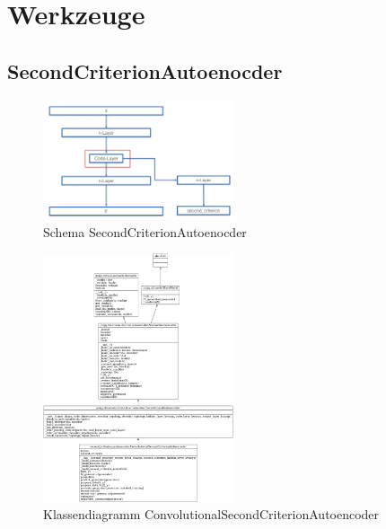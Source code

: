 \listoftodos


\chapter{Werkzeuge}
\label{chap:Werkzeuge}

	\section{SecondCriterionAutoenocder}
	\label{sec:SecondCriterionAutoenocder}
		
		
		
		\begin{figure}[h]
			\centering
			\includegraphics[width=0.5\textwidth, center]{bilder/Schema_Autoencoders/Schema_SCAE.png}
			\caption[Schema SecondCriterionAutoenocder]{Schema SecondCriterionAutoenocder}
			\label{img:SchemaSCAE}
		\end{figure}  
		
		
		\begin{figure}[h]
			\centering
			\includegraphics[width=0.5\textwidth, center]{bilder/Klassendiagramme/Klassendiagramm_CSCAE.png}
			\caption[Klassendiagramm ConvolutionalSecondCriterionAutoencoder]{Klassendiagramm ConvolutionalSecondCriterionAutoencoder}
			\label{img:KlassendiagrammCSCAE}
		\end{figure}  
		
